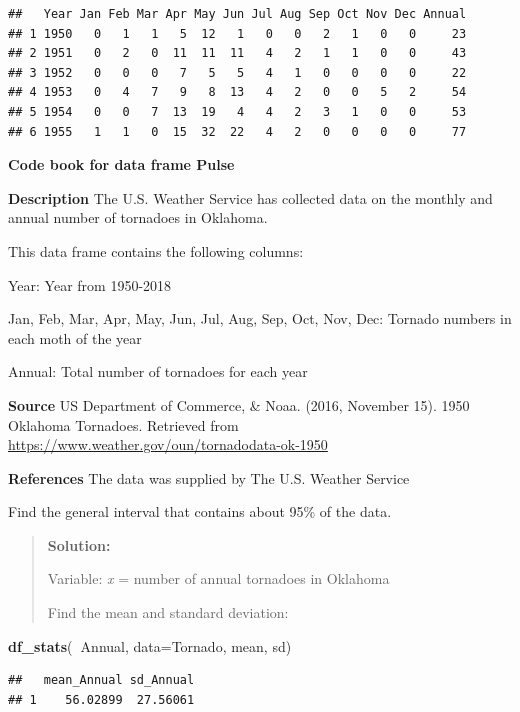 \documentclass[]{book}
\newenvironment{Shaded}{\begin{snugshade}}{\end{snugshade}}
\newcommand{\DataTypeTok}[1]{\textcolor[rgb]{0.13,0.29,0.53}{#1}}
\newcommand{\KeywordTok}[1]{\textcolor[rgb]{0.13,0.29,0.53}{\textbf{#1}}}
\newcommand{\NormalTok}[1]{#1}
\newcommand{\OperatorTok}[1]{\textcolor[rgb]{0.81,0.36,0.00}{\textbf{#1}}}
\begin{document}
\begin{verbatim}
##   Year Jan Feb Mar Apr May Jun Jul Aug Sep Oct Nov Dec Annual
## 1 1950   0   1   1   5  12   1   0   0   2   1   0   0     23
## 2 1951   0   2   0  11  11  11   4   2   1   1   0   0     43
## 3 1952   0   0   0   7   5   5   4   1   0   0   0   0     22
## 4 1953   0   4   7   9   8  13   4   2   0   0   5   2     54
## 5 1954   0   0   7  13  19   4   4   2   3   1   0   0     53
## 6 1955   1   1   0  15  32  22   4   2   0   0   0   0     77
\end{verbatim}

\textbf{Code book for data frame Pulse}

\textbf{Description}
The U.S. Weather Service has collected data on the monthly and annual number of tornadoes in Oklahoma.

This data frame contains the following columns:

Year: Year from 1950-2018

Jan, Feb, Mar, Apr, May, Jun, Jul, Aug, Sep, Oct, Nov, Dec: Tornado numbers in each moth of the year

Annual: Total number of tornadoes for each year

\textbf{Source}
US Department of Commerce, \& Noaa. (2016, November 15). 1950 Oklahoma Tornadoes. Retrieved from \url{https://www.weather.gov/oun/tornadodata-ok-1950}

\textbf{References}
The data was supplied by The U.S. Weather Service

Find the general interval that contains about 95\% of the data.

\begin{quote}
\textbf{Solution:}

Variable: \emph{x} = number of annual tornadoes in Oklahoma

Find the mean and standard deviation:
\end{quote}

\begin{Shaded}
\begin{Highlighting}[]
\KeywordTok{df_stats}\NormalTok{(}\OperatorTok{~}\NormalTok{Annual, }\DataTypeTok{data=}\NormalTok{Tornado, mean, sd)}
\end{Highlighting}
\end{Shaded}

\begin{verbatim}
##   mean_Annual sd_Annual
## 1    56.02899  27.56061
\end{verbatim}
\end{document}
